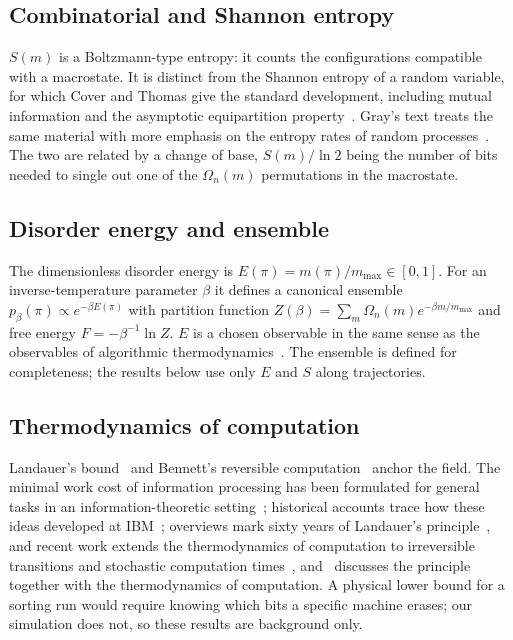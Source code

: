 \documentclass[10pt,journal]{IEEEtran}
\newcommand{\mmax}{m_{\max}}
\begin{document}
\subsection{Combinatorial and Shannon entropy}
$S(m)$ is a Boltzmann-type entropy: it counts the configurations compatible with a macrostate. It is distinct from the Shannon entropy of a random variable, for which Cover and Thomas give the standard development, including mutual information and the asymptotic equipartition property~\cite{ref2}. Gray's text treats the same material with more emphasis on the entropy rates of random processes~\cite{ref3}. The two are related by a change of base, $S(m)/\ln 2$ being the number of bits needed to single out one of the $\Omega_n(m)$ permutations in the macrostate.

\subsection{Disorder energy and ensemble}
\label{sec:ensemble}
The dimensionless disorder energy is $E(\pi)=m(\pi)/\mmax\in[0,1]$. For an inverse-temperature parameter $\beta$ it defines a canonical ensemble $p_\beta(\pi)\propto e^{-\beta E(\pi)}$ with partition function $Z(\beta)=\sum_m\Omega_n(m)e^{-\beta m/\mmax}$ and free energy $F=-\beta^{-1}\ln Z$. $E$ is a chosen observable in the same sense as the observables of algorithmic thermodynamics~\cite{ref11}. The ensemble is defined for completeness; the results below use only $E$ and $S$ along trajectories.

\subsection{Thermodynamics of computation}
Landauer's bound~\cite{ref9} and Bennett's reversible computation~\cite{ref10} anchor the field. The minimal work cost of information processing has been formulated for general tasks in an information-theoretic setting~\cite{ref18}; historical accounts trace how these ideas developed at IBM~\cite{ref20}; overviews mark sixty years of Landauer's principle~\cite{ref25}, and recent work extends the thermodynamics of computation to irreversible transitions and stochastic computation times~\cite{ref28}, and~\cite{ref31} discusses the principle together with the thermodynamics of computation. A physical lower bound for a sorting run would require knowing which bits a specific machine erases; our simulation does not, so these results are background only.
\end{document}
